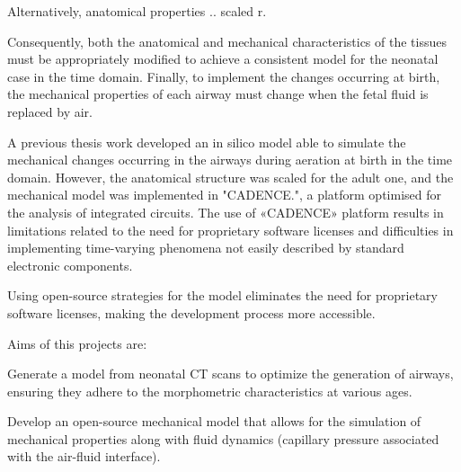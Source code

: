 Alternatively, anatomical properties .. scaled r.

Consequently, both the anatomical and mechanical characteristics of
the tissues must be appropriately modified to achieve a consistent
model for the neonatal case in the time domain.  Finally, to implement
the changes occurring at birth, the mechanical properties of each
airway must change when the fetal fluid is replaced by air.

A previous thesis work developed an in silico model able to simulate
the mechanical changes occurring in the airways during aeration at
birth in the time domain. However, the anatomical structure was scaled
for the adult one, and the mechanical model was implemented in
"CADENCE.", a platform optimised for the analysis of integrated
circuits. The use of «CADENCE» platform results in limitations related
to the need for proprietary software licenses and difficulties in
implementing time-varying phenomena not easily described by standard
electronic components.

Using open-source strategies for the model eliminates the need for
proprietary software licenses, making the development process more
accessible\cite{mani2020}.


Aims of this projects are:
\begin{description}
\item Generate a model from neonatal CT scans to optimize the
  generation of airways, ensuring they adhere to the morphometric
  characteristics at various ages.
\item Develop an open-source mechanical model that allows for the
  simulation of mechanical properties along with fluid dynamics
  \cite[][Ch. 1.9 - 1.11]{mani2020} (capillary pressure associated
  with the air-fluid interface).
\end{description}

